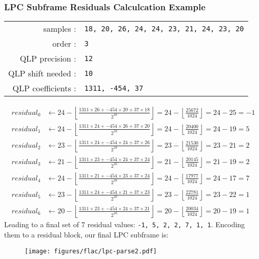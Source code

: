 \subsubsection{LPC Subframe Residuals Calculcation Example}
\begin{tabular}{rl}
samples : & \texttt{18, 20, 26, 24, 24, 23, 21, 24, 23, 20} \\
order : & \texttt{3} \\
QLP precision : &\texttt{12} \\
QLP shift needed : & \texttt{10} \\
QLP coefficients : & \texttt{1311, -454, 37} \\
\end{tabular}
\newline
\begin{align*}
residual_0 &\leftarrow 24 - \left\lfloor\frac{1311 \times 26 + -454 \times 20 + 37 \times 18}{2 ^ {10}}\right\rfloor = 24 - \left\lfloor\frac{25672}{1024}\right\rfloor = 24 - 25 = -1 \\
residual_1 &\leftarrow 24 - \left\lfloor\frac{1311 \times 24 + -454 \times 26 + 37 \times 20}{2 ^ {10}}\right\rfloor = 24 - \left\lfloor\frac{20400}{1024}\right\rfloor = 24 - 19 = 5 \\
residual_2 &\leftarrow 23 - \left\lfloor\frac{1311 \times 24 + -454 \times 24 + 37 \times 26}{2 ^ {10}}\right\rfloor = 23 - \left\lfloor\frac{21530}{1024}\right\rfloor = 23 - 21 = 2 \\
residual_3 &\leftarrow 21 - \left\lfloor\frac{1311 \times 23 + -454 \times 24 + 37 \times 24}{2 ^ {10}}\right\rfloor = 21 - \left\lfloor\frac{20145}{1024}\right\rfloor = 21 - 19 = 2 \\
residual_4 &\leftarrow 24 - \left\lfloor\frac{1311 \times 21 + -454 \times 23 + 37 \times 24}{2 ^ {10}}\right\rfloor = 24 - \left\lfloor\frac{17977}{1024}\right\rfloor = 24 - 17 = 7 \\
residual_5 &\leftarrow 23 - \left\lfloor\frac{1311 \times 24 + -454 \times 21 + 37 \times 23}{2 ^ {10}}\right\rfloor = 23 - \left\lfloor\frac{22781}{1024}\right\rfloor = 23 - 22 = 1 \\
residual_6 &\leftarrow 20 - \left\lfloor\frac{1311 \times 23 + -454 \times 24 + 37 \times 21}{2 ^ {10}}\right\rfloor = 20 - \left\lfloor\frac{20034}{1024}\right\rfloor = 20 - 19 = 1
\end{align*}
Leading to a final set of 7 residual values: \texttt{-1, 5, 2, 2, 7, 1, 1}.
Encoding them to a residual block, our final LPC subframe is:
\begin{figure}[h]
\texttt{[image: figures/flac/lpc-parse2.pdf]}
\end{figure}

